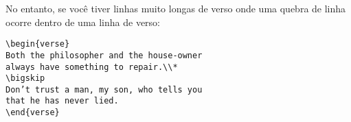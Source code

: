 No entanto, se você tiver linhas muito longas de verso onde uma quebra de linha ocorre dentro de uma linha de verso:
\newpage

\begin{verbatim}
\begin{verse}
Both the philosopher and the house-owner
always have something to repair.\\*
\bigskip
Don’t trust a man, my son, who tells you
that he has never lied.
\end{verse}
\end{verbatim}

